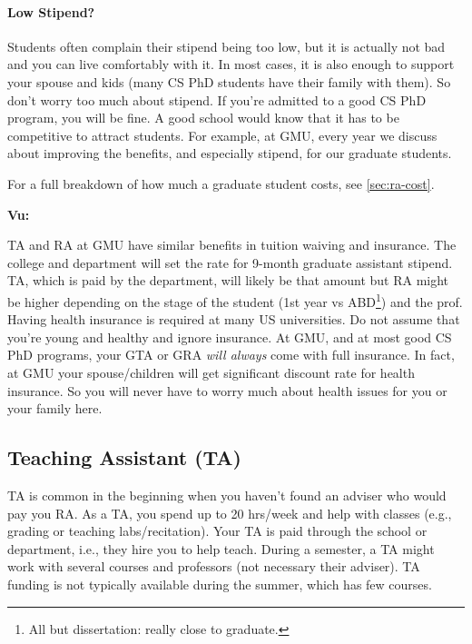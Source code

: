 \documentclass[oneside,11pt]{memoir}
\newenvironment{commentbox}[1][]{
  \small
  \begin{mybox}
    {\small \textbf{#1}}
  }{
  \end{mybox}
}
\begin{document}
\paragraph{Low Stipend?} Students often complain their stipend being too low, but it is actually not bad and you can live comfortably with it.  In most cases, it is also enough to support your spouse and kids (many CS PhD students have their family with them). So don't worry too much about stipend.  If you're admitted to a good CS PhD program, you will be fine. A good school would know that it has to be competitive to attract students.  For example, at GMU, every year we discuss about improving the benefits, and especially stipend, for our graduate students. 

For a full breakdown of how much a graduate student costs, see \autoref{sec:ra-cost}.

\begin{commentbox}[Vu:]
  TA and RA at GMU have similar benefits in tuition waiving and insurance.  The college and department will set the rate for 9-month graduate assistant stipend.  TA, which is paid by the department, will likely be that amount but RA might be higher depending on the stage of the student (1st year vs ABD\footnote{All but dissertation: really close to graduate.}) and the prof.
  \tcblower
  Having health insurance is required at many US universities.  Do not assume that you're young and healthy and ignore insurance.  At GMU, and at most good CS PhD programs, your GTA or GRA \emph{will always} come with full insurance. In fact, at GMU your spouse/children will get significant discount rate for health insurance.  So you will never have to worry much about health issues for you or your family here.
\end{commentbox}


\subsection{Teaching Assistant (TA)}\label{sec:ta}

TA is common in the beginning when you haven't found an adviser who would pay you RA. As a TA, you spend up to 20 hrs/week and help with classes (e.g., grading or teaching labs/recitation). Your TA is paid through the school or department, i.e., they hire you to help teach.  During a semester, a TA might work with several courses and professors (not necessary their adviser).  TA funding is not typically available during the summer, which has few courses.
\end{document}

